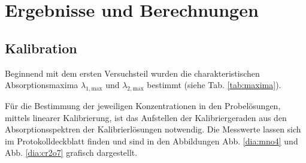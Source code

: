 \newpage
\section{Ergebnisse und Berechnungen}
\label{sec:ergebnisse}

\subsection*{Kalibration}
Beginnend mit dem ersten Versuchsteil wurden die charakteristischen Absorptionsmaxima $\lambda_{1,\text{max}}$ und $\lambda_{2,\text{max}}$ bestimmt (siehe Tab. \ref{tab:maxima}).

\begin{table}[h!]
	\renewcommand*{\arraystretch}{1.2}
	\centering
	\caption{Absorptionsmaxima  vom Permanganat-Ion $\lambda_{1,\text{max}}$ und vom Dichromat-Ion $\lambda_{2,\text{max}}$ }
	\label{tab:maxima}
\end{table}%
\FloatBarrier

Für die Bestimmung der jeweiligen Konzentrationen in den Probelösungen, mittels linearer Kalibrierung, ist das Aufstellen der Kalibriergeraden aus den Absorptionsspektren der Kalibrierlösungen notwendig. Die Messwerte lassen sich im Protokolldeckblatt finden und sind in den Abbildungen Abb. \ref{dia:mno4} und Abb. \ref{dia:cr2o7} grafisch dargestellt.


